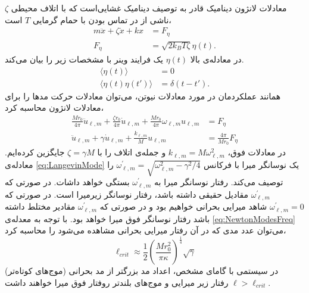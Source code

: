 معادلات لانژون دینامیک قادر به توصیف دینامیک غشایی‌است که با اتلاف محیطی
$\zeta$
ناشی از در تماس بودن با حمام گرمایی
$T$
است،
\begin{equation}
\begin{aligned}
m\ddot{x}+\zeta\dot{x}+kx&=F_{\eta}\\
F_{\eta}&=\sqrt{2k_BT\zeta}\eta(t).
\end{aligned}
\label{eq:LangevinEq}
\end{equation}
در معادله‌ی بالا 
$\eta(t)$
یک فرایند وینر
با مشخصات زیر را بیان می‌کند.
\begin{equation}
\begin{aligned}
\langle\eta(t)\rangle&=0\\
\langle\eta(t)\eta(t')\rangle&=\delta(t-t').
\end{aligned}
\label{eq:Wiener}
\end{equation}
همانند عملکردمان در مورد معادلات نیوتن، می‌توان معادلات حرکت مد‌ها را برای معادلات لانژون محاسبه کرد،
\begin{equation}
\begin{aligned} 
\frac{Mr_0}{4\pi}\ddot{u}_{\ell,m}+\frac{\zeta r_0}{4\pi}\dot{u}_{\ell,m}+\frac{Mr_0}{4\pi}\omega_{\ell,m}u_{\ell,m}&=F_{\eta}\\
\ddot{u}_{\ell,m}+\gamma \dot{u}_{\ell,m}+\frac{k_{\ell,m}}{M}u_{\ell,m}&=\frac{4\pi}{Mr_0}F_{\eta}
\end{aligned}
\label{eq:LangevinMode}
\end{equation}
در معادلات فوق، 
$k_{\ell,m}=M\omega_{\ell,m}^2$
و جمله‌ی اتلاف را با 
$\zeta=\gamma M$
جایگزین کرده‌ایم. معادله‌ی 
\ref{eq:LangevinMode}
یک نوسانگر میرا با فرکانس
$\omega_{\ell,m} ^{\prime}=\sqrt{\omega_{\ell,m}^{2}-\gamma^2/4}$
را توصیف می‌کند. رفتار نوسانگر میرا به 
$\omega_{\ell,m}^{\prime}$
بستگی خواهد داشات. در صورتی که 
$\omega_{\ell,m}^{\prime}$
مقادیل حقیقی داشته باشد، رفتار نوسانگر زیرمیرا
است. در صورتی که 
$\omega_{\ell,m}^\prime=0$
شاهد میرایی بحرانی 
خواهیم بود و در صورتی که 
$\omega_{\ell,m}^{\prime}$
مقادیر مختلط داشته باشد رفتار نوسانگر فوق میرا 
خواهد بود. با توجه به معدله‌ی
\ref{eq:NewtonModesFreq}
می‌توان عدد مدی که در آن رفتار میرایی بحرانی مشاهده می‌شود را محاسبه کرد،
\begin{equation}
\ell_{crit}\approx\frac{1}{2}\left(\frac{Mr_0^2}{\pi\kappa}\right)^\frac{1}{4}\sqrt\gamma
\label{eq:criticalMode}
\end{equation}
در سیستمی با گامای مشخص، اعداد مد بزرگتر از مد بحرانی (موج‌های کوتاه‌تر) 
$\ell>\ell_{crit}$
رفتار زیر میرایی و موج‌های بلندتر روفتار فوق میرا خواهند داشت.



